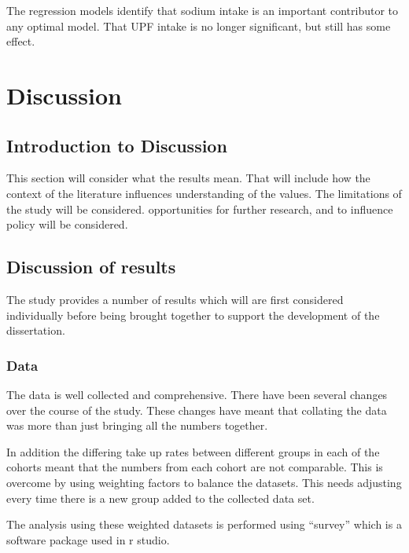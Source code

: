 \documentclass[
]{article}
\begin{document}
The regression models identify that sodium intake is an important
contributor to any optimal model. That UPF intake is no longer
significant, but still has some effect. \newpage

\hypertarget{discussion}{%
\section{Discussion}\label{discussion}}

\hypertarget{introduction-to-discussion}{%
\subsection{Introduction to
Discussion}\label{introduction-to-discussion}}

This section will consider what the results mean. That will include how
the context of the literature influences understanding of the values.
The limitations of the study will be considered. opportunities for
further research, and to influence policy will be considered.

\hypertarget{discussion-of-results}{%
\subsection{Discussion of results}\label{discussion-of-results}}

The study provides a number of results which will are first considered
individually before being brought together to support the development of
the dissertation.

\hypertarget{data}{%
\subsubsection{Data}\label{data}}

The data is well collected and comprehensive. There have been several
changes over the course of the study. These changes have meant that
collating the data was more than just bringing all the numbers together.

In addition the differing take up rates between different groups in each
of the cohorts meant that the numbers from each cohort are not
comparable. This is overcome by using weighting factors to balance the
datasets. This needs adjusting every time there is a new group added to
the collected data set.

The analysis using these weighted datasets is performed using ``survey''
which is a software package used in r studio.
\end{document}
